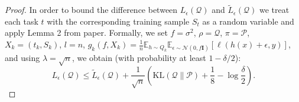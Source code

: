 \documentclass[letterpaper]{article} %
\begin{document}
\begin{proof}
In order to bound the difference between $L_{\epsilon}(\mathcal{Q})$ and $\tilde{L}_\epsilon(\mathcal{Q})$ we treat each task $t$ with the corresponding training sample $S_t$ as a random variable and apply Lemma 2 from paper\cite{pentinaPACBayesianBoundLifelong2014}. Formally, we set $f = \sigma^2$, $\rho = \mathcal{Q}$, $\pi = \mathcal{P}$, $X_k = (t_k, S_k)$, $l = n$, $ g_k(f, X_k) = \frac{1}{n} \mathbb{E}_{h \sim Q_k} \mathbb{E}_{\epsilon \sim \mathcal{N}(0, f\mathbf{I})} [\ell(h(x) + \epsilon, y)] $, and using $\lambda = \sqrt{n}$, we obtain (with probability at least $1-\delta/2$):
$$ L_{\epsilon}(\mathcal{Q}) \leq \tilde{L}_\epsilon(\mathcal{Q}) + \frac{1}{\sqrt{n}}\left( \mathrm{KL}(\mathcal{Q} \| \mathcal{P}) + \frac{1}{8} - \log\frac{\delta}{2} \right).$$





\end{proof}
\end{document}
